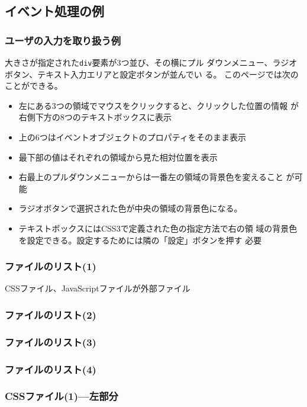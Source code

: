 \subsection{イベント処理の例}
\begin{frame}[containsverbatim]
\frametitle{ユーザの入力を取り扱う例}
大きさが指定された\texttt{div}要素が3つ並び、その横にプル
 ダウンメニュー、ラジオボタン、テキスト入力エリアと設定ボタンが並んでい
 る。
このページでは次のことができる。
\begin{itemize}
 \item 左にある3つの領域でマウスをクリックすると、クリックした位置の情報
       が右側下方の8つのテキストボックスに表示
 \item 上の6つはイベントオブジェクトのプロパティをそのまま表示
 \item 最下部の値はそれぞれの領域から見た相対位置を表示
 \item 右最上のプルダウンメニューからは一番左の領域の背景色を変えること
       が可能
 \item ラジオボタンで選択された色が中央の領域の背景色になる。
 \item テキストボックスにはCSS3で定義された色の指定方法で右の領
       域の背景色を設定できる。設定するためには隣の「設定」ボタンを押す
       必要
\end{itemize}
\end{frame}
\begin{frame}[containsverbatim]
\frametitle{ファイルのリスト(1)}
CSSファイル、JavaScriptファイルが外部ファイル
\end{frame}
\begin{frame}[containsverbatim]
\frametitle{ファイルのリスト(2)}
\end{frame}
\begin{frame}[containsverbatim]
\frametitle{ファイルのリスト(3)}
\end{frame}
\begin{frame}[containsverbatim]
\frametitle{ファイルのリスト(4)}
\end{frame}
\begin{frame}[containsverbatim]
\frametitle{CSSファイル(1)---左部分}
\end{frame}
